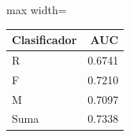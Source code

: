 \begin{center}\small\setlength{\tabcolsep}{4pt}
\begin{adjustbox}{max width=\textwidth}\begin{tabular}{lr}
\toprule
Clasificador & AUC \\ \midrule
R & 0.6741 \\
F & 0.7210 \\
M & 0.7097 \\
Suma & 0.7338 \\
\bottomrule\end{tabular}\end{adjustbox}\end{center}
